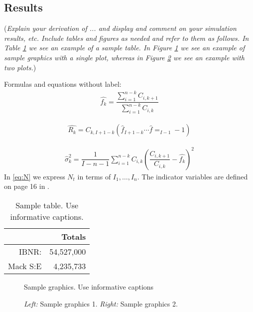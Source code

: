 \documentclass[a4paper]{article}
\begin{document}
\subsection*{Results}

({\it Explain your derivation of ... and display and comment on your simulation results, etc. Include tables and figures as needed and refer to them as follows. In Table \ref{tab:sampletab} we see an example of a sample table. In Figure \ref{fig:samplefig1} we see an example of sample graphics with a single plot, whereas in Figure \ref{fig:samplefig2} we see an example with two plots.}) 

Formulas and equations without label:
\begin{align*}
	\hat{f_k} = \dfrac{\sum_{i=1}^{n-k} C_{i,k+1}} {\sum_{i=1}^{n-k} C_{i,k}}
\end{align*}

\begin{align*}
	\hat{R_k} = C_{k,I+1-k} \left(  \hat{f}_{I+1-k} \cdots \hat{f}=_{I-1}-1\right)
\end{align*}

\begin{align}\label{eq:N}
	\hat{\sigma}_k^2 = \dfrac{1}{I-n-1} \sum_{i=1}^{n-k} C_{i,k}\left( \dfrac{ C_{i,k+1}}{ C_{i,k}} -\hat{f_k} \right)^2
\end{align}
In \eqref{eq:N} we express $N_t$ in terms of $I_1,\dots,I_n$. The indicator variables are defined on page 16 in \cite{Wuthrich-Merz-13}.

\begin{table}[!ht]
\center
\begin{tabular}{rr}
	& Totals \\ 
\hline
IBNR: & 54,527,000 \\
Mack S:E & 4,235,733\\
\hline
\end{tabular}
\caption{Sample table. Use informative captions.} \label{tab:sampletab}
\end{table}


 \begin{figure}[!ht]
 \center
  \caption{Sample graphics. Use informative captions}
  \label{fig:samplefig1}
\end{figure}


 \begin{figure}[!ht]
 \center
  \caption{\emph{Left:} Sample graphics 1. \emph{Right:} Sample graphics 2.}
  \label{fig:samplefig2}
\end{figure}
\end{document}

